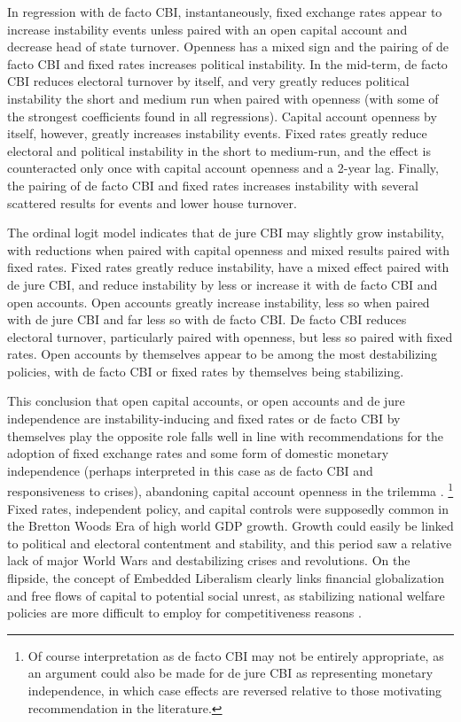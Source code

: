 \documentclass{article}
\begin{document}
    In regression with de facto CBI, instantaneously, fixed exchange rates appear to increase instability events unless paired with an open capital account and decrease head of state turnover. Openness has a mixed sign and the pairing of de facto CBI and fixed rates increases political instability. In the mid-term, de facto CBI reduces electoral turnover by itself, and very greatly reduces political instability the short and medium run when paired with openness (with some of the strongest coefficients found in all regressions). Capital account openness by itself, however, greatly increases instability events. Fixed rates greatly reduce electoral and political instability in the short to medium-run, and the effect is counteracted only once with capital account openness and a 2-year lag. Finally, the pairing of de facto CBI and fixed rates increases instability with several scattered results for events and lower house turnover.

    The ordinal logit model indicates that de jure CBI may slightly grow instability, with reductions when paired with capital openness and mixed results paired with fixed rates. Fixed rates greatly reduce instability, have a mixed effect paired with de jure CBI, and reduce instability by less or increase it with de facto CBI and open accounts. Open accounts greatly increase instability, less so when paired with de jure CBI and far less so with de facto CBI. De facto CBI reduces electoral turnover, particularly paired with openness, but less so paired with fixed rates. Open accounts by themselves appear to be among the most destabilizing policies, with de facto CBI or fixed rates by themselves being stabilizing.

    This conclusion that open capital accounts, or open accounts and de jure independence are instability-inducing and fixed rates or de facto CBI by themselves play the opposite role falls well in line with recommendations for the adoption of fixed exchange rates and some form of domestic monetary independence (perhaps interpreted in this case as de facto CBI and responsiveness to crises), abandoning capital account openness in the trilemma \citep{rodrik_globalization_2011}. \footnote{Of course interpretation as de facto CBI may not be entirely appropriate, as an argument could also be made for de jure CBI as representing monetary independence, in which case effects are reversed relative to those motivating recommendation in the literature.} Fixed rates, independent policy, and capital controls were supposedly common in the Bretton Woods Era of high world GDP growth. Growth could easily be linked to political and electoral contentment and stability, and this period saw a relative lack of major World Wars and destabilizing crises and revolutions. On the flipside, the concept of Embedded Liberalism clearly links financial globalization and free flows of capital to potential social unrest, as stabilizing national welfare policies are more difficult to employ for competitiveness reasons \citep{ruggie_international_1982}.
\end{document}

